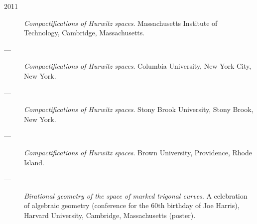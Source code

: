 \documentclass[11pt]{article}
\begin{document}
\begin{description}
\item[{2011}] \emph{Compactifications of Hurwitz spaces}. Massachusetts Institute of Technology, Cambridge, Massachusetts.
\item[{---}] \emph{Compactifications of Hurwitz spaces}. Columbia University, New York City, New York.
\item[{---}] \emph{Compactifications of Hurwitz spaces}. Stony Brook University, Stony Brook, New York.
\item[{---}] \emph{Compactifications of Hurwitz spaces}. Brown University, Providence, Rhode Island.
\item[{---}] \emph{Birational geometry of the space of marked trigonal curves}. A celebration of algebraic geometry (conference for the 60th birthday of Joe Harris), Harvard University, Cambridge, Massachusetts (poster).
\end{description}
\end{document}
